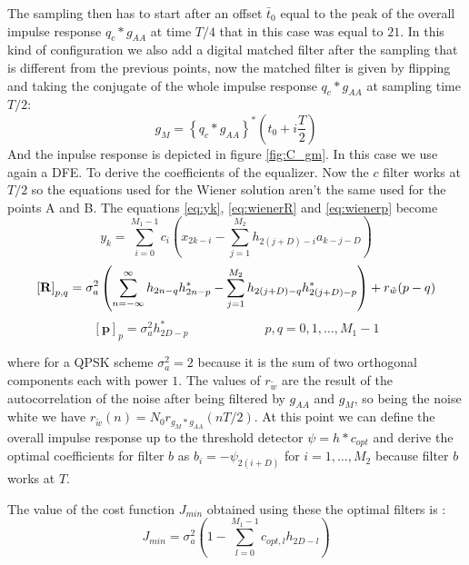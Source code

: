 \documentclass[a4paper,11.5pt]{article}
\begin{document}
The sampling then has to start after an offset $\bar{t}_0$ equal to the peak of the overall impulse response $q_c*g_{AA}$ at time $T/4$ that in this case was equal to $21$.  
In this kind of configuration we also add a digital matched filter after the sampling that is different from the previous points, now the matched filter is given by flipping and taking the conjugate of the whole impulse response $q_c*g_{AA}$ at sampling time $T/2$:
\begin{equation}
g_M = \left\{ q_c * g_{AA} \right\}^* \left(t_0 + i \frac{T}{2}\right) 
\end{equation}
And the inpulse response is depicted in figure \ref{fig:C_gm}. %
In this case we use again a DFE. To derive the coefficients of the equalizer. Now the $c$ filter works at $T/2$ so the equations used for the Wiener solution aren't the same used for the points A and B. The equations \ref{eq:yk}, \ref{eq:wienerR} and \ref{eq:wienerp} become
\begin{equation} \label{eq:C_yk}
y_k = \sum_{i=0}^{M_1-1}c_i \left(x_{2k-i}-\sum_{j=1}^{M_2}h_{2(j+D)-i}a_{k-j-D} \right)
\end{equation}
\begin{equation} \label{eq:C_wienerR}
\mathbf{[R]}_{p,q}  = \sigma_a^2 \left( \sum_{n=-\infty}^{\infty}h_{2n-q}h^*_{2n-p}-\sum_{j=1}^{M_2}h_{2(j+D)-q}h^*_{2(j+D)-p} \right) + r_{\tilde{w}}(p-q) \\
\end{equation}
\begin{equation} \label{eq:C_wienerp}
\mathbf{[p]}_p = \sigma_a^2 h^*_{2D-p} \quad\quad\quad\quad\quad\quad p,q = 0,1,\dots,M_1-1
\end{equation}

where for a QPSK scheme $\sigma_a^2=2$ because it is the sum of two orthogonal components each with power $1$. The values of $r_{\tilde{w}}$ are the result of the autocorrelation of the noise after being filtered by $g_{AA}$ and $g_M$, so being the noise white we have $r_{\tilde{w}}(n)=N_0r_{g_M * g_{AA}}(nT/2)$. At this point we can define the overall impulse response up to the threshold detector $\psi = h*c_{opt}$ and derive the optimal coefficients for filter $b$ as $b_i=-\psi_{2(i+D)}$ for $i=1,\dots,M_2$ because filter $b$ works at $T$. 

The value of the cost function $J_{min}$ obtained using these the optimal filters is :
\begin{equation} \label{eq:C_jmin}
J_{min} = \sigma^2_a \left( 1-\sum_{l=0}^{M_1-1} c_{opt,l}h_{2D-l}\right)
\end{equation}
\end{document}
